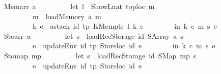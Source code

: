 \begin{isabellebody}
\ \ {\isacharbar}{\kern0pt}\ \ Memarr\ a\ {\isasymRightarrow}\isanewline
\ \ \ \ \ \ \ \ let\ l\ {\isacharequal}{\kern0pt}\ ShowL\isactrlsub n\isactrlsub a\isactrlsub t\ {\isacharparenleft}{\kern0pt}toploc\ m{\isacharparenright}{\kern0pt}{\isacharsemicolon}{\kern0pt}\isanewline
\ \ \ \ \ \ \ \ \ \ \ \ m{\isacharprime}{\kern0pt}\ {\isacharequal}{\kern0pt}\ load\isactrlsub M\isactrlsub e\isactrlsub m\isactrlsub o\isactrlsub r\isactrlsub y\ a\ m{\isacharsemicolon}{\kern0pt}\isanewline
\ \ \ \ \ \ \ \ \ \ \ \ {\isacharparenleft}{\kern0pt}k{\isacharprime}{\kern0pt}{\isacharcomma}{\kern0pt}\ e{\isacharprime}{\kern0pt}{\isacharparenright}{\kern0pt}\ {\isacharequal}{\kern0pt}\ astack\ id{\isacharprime}{\kern0pt}\ tp\ {\isacharparenleft}{\kern0pt}KMemptr\ l{\isacharparenright}{\kern0pt}\ {\isacharparenleft}{\kern0pt}k{\isacharcomma}{\kern0pt}\ e{\isacharparenright}{\kern0pt}\isanewline
\ \ \ \ \ \ \ \ in\ {\isacharparenleft}{\kern0pt}k{\isacharprime}{\kern0pt}{\isacharcomma}{\kern0pt}\ c{\isacharcomma}{\kern0pt}\ m{\isacharprime}{\kern0pt}{\isacharcomma}{\kern0pt}\ s{\isacharcomma}{\kern0pt}\ e{\isacharprime}{\kern0pt}{\isacharparenright}{\kern0pt}\isanewline
\ \ {\isacharbar}{\kern0pt}\ \ Stoarr\ a\ {\isasymRightarrow}\isanewline
\ \ \ \ \ \ \ \ let\ s{\isacharprime}{\kern0pt}\ {\isacharequal}{\kern0pt}\ loadRec\isactrlsub S\isactrlsub t\isactrlsub o\isactrlsub r\isactrlsub a\isactrlsub g\isactrlsub e\ id{\isacharprime}{\kern0pt}\ {\isacharparenleft}{\kern0pt}SArray\ a{\isacharparenright}{\kern0pt}\ s{\isacharsemicolon}{\kern0pt}\isanewline
\ \ \ \ \ \ \ \ \ \ \ \ e{\isacharprime}{\kern0pt}\ {\isacharequal}{\kern0pt}\ updateEnv\ id{\isacharprime}{\kern0pt}\ tp\ {\isacharparenleft}{\kern0pt}Storeloc\ id{\isacharprime}{\kern0pt}{\isacharparenright}{\kern0pt}\ e\isanewline
\ \ \ \ \ \ \ \ in\ {\isacharparenleft}{\kern0pt}k{\isacharcomma}{\kern0pt}\ c{\isacharcomma}{\kern0pt}\ m{\isacharcomma}{\kern0pt}\ s{\isacharprime}{\kern0pt}{\isacharcomma}{\kern0pt}\ e{\isacharprime}{\kern0pt}{\isacharparenright}{\kern0pt}\isanewline
\ \ {\isacharbar}{\kern0pt}\ \ Stomap\ mp\ {\isasymRightarrow}\isanewline
\ \ \ \ \ \ \ \ let\ s{\isacharprime}{\kern0pt}\ {\isacharequal}{\kern0pt}\ loadRec\isactrlsub S\isactrlsub t\isactrlsub o\isactrlsub r\isactrlsub a\isactrlsub g\isactrlsub e\ id{\isacharprime}{\kern0pt}\ {\isacharparenleft}{\kern0pt}SMap\ mp{\isacharparenright}{\kern0pt}\ s{\isacharsemicolon}{\kern0pt}\isanewline
\ \ \ \ \ \ \ \ \ \ \ \ e{\isacharprime}{\kern0pt}\ {\isacharequal}{\kern0pt}\ updateEnv\ id{\isacharprime}{\kern0pt}\ tp\ {\isacharparenleft}{\kern0pt}Storeloc\ id{\isacharprime}{\kern0pt}{\isacharparenright}{\kern0pt}\ e\isanewline

\end{isabellebody}
